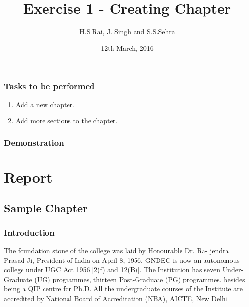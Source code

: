 \documentclass[a4paper,12pt,twoside]{report}
\title{Exercise 1 - Creating Chapter}
\author{H.S.Rai, J. Singh and S.S.Sehra}
\date{12th March, 2016}
\begin{document}
\maketitle	

\section*{Tasks to be performed}
\begin{enumerate}	
\item Add a new chapter.
\item Add more sections to the chapter.
\end{enumerate}
\section*{Demonstration}
\part{Report}
\chapter{Sample Chapter}
\section{Introduction}
The foundation stone of the college was laid by Honourable Dr. Ra-
jendra Prasad Ji, President of India on April 8, 1956. GNDEC is now an
autonomous college under UGC Act 1956 [2(f) and 12(B)]. The Institution
has seven Under-Graduate (UG) programmes, thirteen Post-Graduate (PG)
programmes, besides being a QIP centre for Ph.D. All the undergraduate
courses of the Institute are accredited by National Board of Accreditation
(NBA), AICTE, New Delhi
\end{document}
